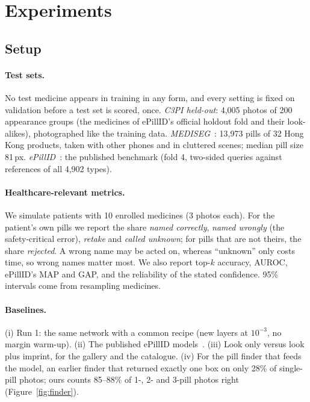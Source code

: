 \section{Experiments}
\label{sec:experiments}

\subsection{Setup}
\label{sec:setup}

\paragraph{Test sets.} No test medicine appears in training in any form, and every setting is fixed on validation
before a test set is scored, once. \emph{C3PI held-out}: 4,005 photos of 200 appearance groups (the medicines of
ePillID's official holdout fold and their look-alikes), photographed like the training data.
\emph{MEDISEG}~\citep{mediseg2026}: 13,973 pills of 32 Hong Kong products, taken with other phones and in cluttered
scenes; median pill size 81\,px. \emph{ePillID}~\citep{usuyama2020epillid}: the published benchmark (fold 4,
two-sided queries against references of all 4,902 types).

\paragraph{Healthcare-relevant metrics.} We simulate patients with 10 enrolled medicines (3 photos each). For the
patient's own pills we report the share \emph{named correctly}, \emph{named wrongly} (the safety-critical error),
\emph{retake} and \emph{called unknown}; for pills that are not theirs, the share \emph{rejected}. A wrong name may be
acted on, whereas ``unknown'' only costs time, so wrong names matter most. We also report top-$k$ accuracy, AUROC,
ePillID's MAP and GAP, and the reliability of the stated confidence. 95\% intervals come from resampling medicines.

\paragraph{Baselines.} (i) Run 1: the same network with a common recipe (new layers at $10^{-3}$, no margin
warm-up). (ii) The published ePillID models~\citep{usuyama2020epillid}. (iii) Look only versus look plus imprint, for
the gallery and the catalogue. (iv) For the pill finder that feeds the model, an earlier finder that returned exactly
one box on only 28\% of single-pill photos; ours counts 85--88\% of 1-, 2- and 3-pill photos right
(Figure~\ref{fig:finder}).

